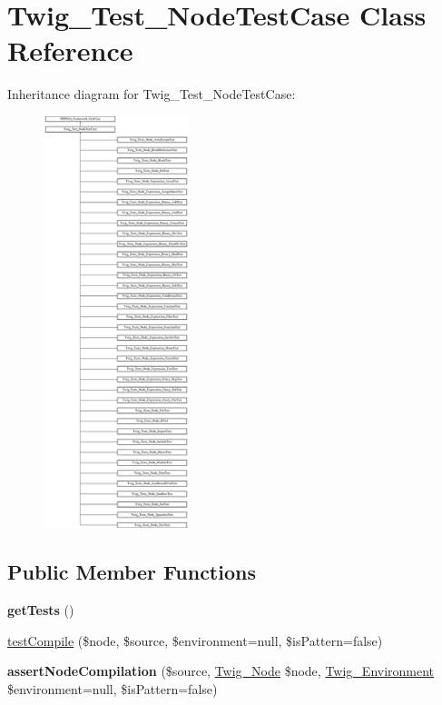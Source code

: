 \hypertarget{classTwig__Test__NodeTestCase}{}\section{Twig\+\_\+\+Test\+\_\+\+Node\+Test\+Case Class Reference}
\label{classTwig__Test__NodeTestCase}
Inheritance diagram for Twig\+\_\+\+Test\+\_\+\+Node\+Test\+Case\+:\begin{figure}[H]
\begin{center}
\leavevmode
\includegraphics[height=12.000000cm]{classTwig__Test__NodeTestCase}
\end{center}
\end{figure}
\subsection*{Public Member Functions}
\begin{DoxyCompactItemize}
\item 
{\bfseries get\+Tests} ()\hypertarget{classTwig__Test__NodeTestCase_ac4e9930646c4d492552376a1a4f3b908}{}\label{classTwig__Test__NodeTestCase_ac4e9930646c4d492552376a1a4f3b908}

\item 
\hyperlink{classTwig__Test__NodeTestCase_ad8215f5b0255aced191cd5c77ba72669}{test\+Compile} (\$node, \$source, \$environment=null, \$is\+Pattern=false)
\item 
{\bfseries assert\+Node\+Compilation} (\$source, \hyperlink{classTwig__Node}{Twig\+\_\+\+Node} \$node, \hyperlink{classTwig__Environment}{Twig\+\_\+\+Environment} \$environment=null, \$is\+Pattern=false)\hypertarget{classTwig__Test__NodeTestCase_a94065447d8392ee622847fb79b1d926b}{}\label{classTwig__Test__NodeTestCase_a94065447d8392ee622847fb79b1d926b}

\end{DoxyCompactItemize}
